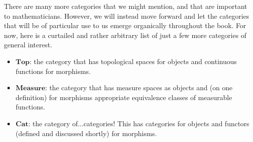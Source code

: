 \documentclass[a4paper]{book}
\theoremstyle{definition}
\theoremstyle{definition}
\theoremstyle{definition}
\theoremstyle{theorem}
\theoremstyle{definition}
\begin{document}
There are many more categories that we might mention, and that are important to mathematicians. However, we will instead move forward and let the categories that will be of particular use to us emerge organically throughout the book. For now, here is a curtailed and rather arbitrary list of just a few more categories of general interest. 
\begin{itemize}
	\item $\textbf{Top}$: the category that has topological spaces for objects and continuous functions for morphisms. 
	\item $\textbf{Measure}$: the category that has measure spaces as objects and (on one definition) for morphisms appropriate equivalence classes of measurable functions. 
	\item $\textbf{Cat}$: the category of...categories! This has categories for objects and functors (defined and discussed shortly) for morphisms.  
\end{itemize}
\end{document}
